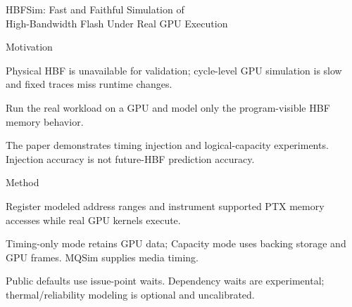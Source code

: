 \begin{frame}[t]{HBFSim: Fast and Faithful Simulation of\\High-Bandwidth Flash Under Real GPU Execution}
\vspace{.02cm}
\begin{minipage}[t][3.25cm][t]{\linewidth}
\begin{summarysection}{Motivation}
\item {} Physical HBF is unavailable for validation; cycle-level GPU simulation is slow and fixed traces miss runtime changes.
\item {} Run the real workload on a GPU and model only the program-visible HBF memory behavior.
\item {} The paper demonstrates timing injection and logical-capacity experiments. Injection accuracy is not future-HBF prediction accuracy.
\end{summarysection}
\end{minipage}
\vspace{.18cm}
\begin{summarysection}{Method}
\item {} Register modeled address ranges and instrument supported PTX memory accesses while real GPU kernels execute.
\item {} Timing-only mode retains GPU data; Capacity mode uses backing storage and GPU frames. MQSim supplies media timing.
\item {} Public defaults use issue-point waits. Dependency waits are experimental; thermal/reliability modeling is optional and uncalibrated.
\end{summarysection}
\end{frame}
